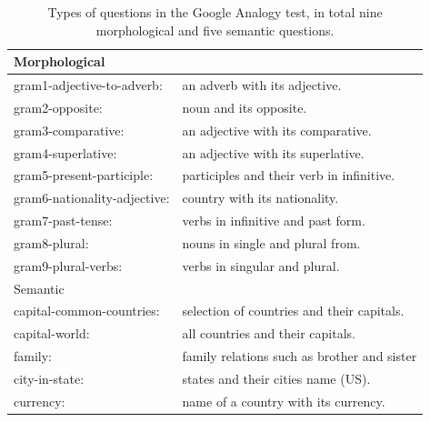 \begin{table}[h]
\centering

\begin{tabular}{ll}
        \toprule
{Morphological} & \\         \midrule

gram1-adjective-to-adverb:& an adverb with its adjective.            \\ \hline
gram2-opposite: &noun and its opposite.                          \\ \hline
gram3-comparative: & an adjective with its comparative.                                           \\ \hline
gram4-superlative:&an adjective with its superlative.                                                    \\ \hline
gram5-present-participle:&participles and their verb in infinitive.                                           \\ \hline
gram6-nationality-adjective:&country with its nationality.                                                                \\ \hline
gram7-past-tense: &verbs in infinitive and past form.                                                             \\ \hline
gram8-plural:& nouns in single and plural from.                                                         \\ \hline
gram9-plural-verbs: &verbs in singular and plural.                                                          \\ 
\midrule
\midrule
{Semantic}&\\   
\midrule

capital-common-countries:                 &           selection of countries and their capitals.\\ \hline
capital-world:          &        all countries and their capitals.    \\ \hline
family:     &             family relations such as brother and sister  \\ \hline
city-in-state:   &      states and their cities name (US). \\ \hline
currency:    &        name of a country with its currency.  \\
\bottomrule
\end{tabular}
 \caption{Types of questions in the Google Analogy test, in total nine
  morphological and five semantic questions.} 
  \label{table:analogy_types}
\end{table}
